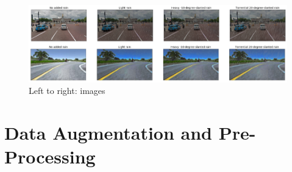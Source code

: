 \begin{figure}[h!]
\centering
\includegraphics[width=\textwidth]{Figures/AutomoldRain.png}
\caption{Left to right: images}
\label{fig:AutomoldRoadAugmentationLibrary}
\end{figure}


\section{Data Augmentation and Pre-Processing}

